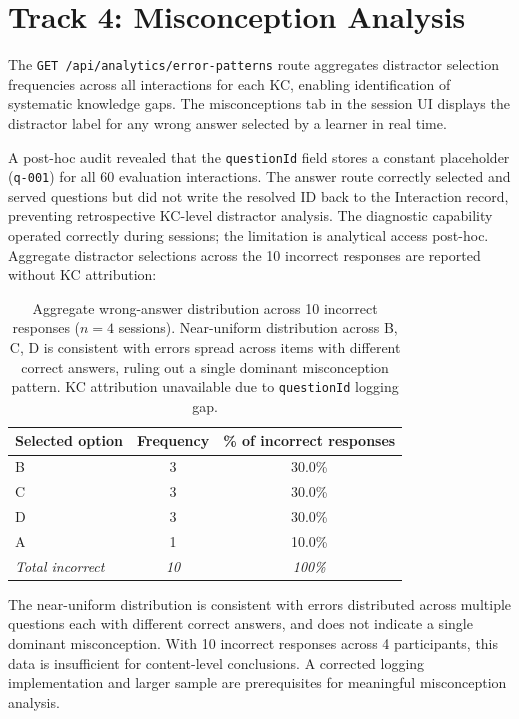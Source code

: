 \section{Track 4: Misconception Analysis}
\label{sec:results_misconceptions}

The \texttt{GET /api/analytics/error-patterns} route aggregates distractor
selection frequencies across all interactions for each KC, enabling
identification of systematic knowledge gaps. The misconceptions tab in the
session UI displays the distractor label for any wrong answer selected by a
learner in real time.

A post-hoc audit revealed that the \texttt{questionId} field stores a constant
placeholder (\texttt{q-001}) for all 60 evaluation interactions. The answer
route correctly selected and served questions but did not write the resolved ID
back to the Interaction record, preventing retrospective KC-level distractor
analysis. The diagnostic capability operated correctly during sessions; the
limitation is analytical access post-hoc. Aggregate distractor selections
across the 10 incorrect responses are reported without KC attribution:

\begin{table}[H]
\centering
\caption{Aggregate wrong-answer distribution across 10 incorrect responses
($n = 4$ sessions). Near-uniform distribution across B, C, D is consistent
with errors spread across items with different correct answers, ruling out
a single dominant misconception pattern. KC attribution unavailable due to
\texttt{questionId} logging gap.}
\label{tab:misconceptions}
\renewcommand{\arraystretch}{1.25}
\begin{tabular}{lcc}
\toprule
\textbf{Selected option} & \textbf{Frequency} & \textbf{\% of incorrect responses} \\
\midrule
B & 3 & 30.0\% \\
C & 3 & 30.0\% \\
D & 3 & 30.0\% \\
A & 1 & 10.0\% \\
\midrule
\textit{Total incorrect} & \textit{10} & \textit{100\%} \\
\bottomrule
\end{tabular}
\end{table}

The near-uniform distribution is consistent with errors distributed across
multiple questions each with different correct answers, and does not indicate
a single dominant misconception. With 10 incorrect responses across 4
participants, this data is insufficient for content-level conclusions. A
corrected logging implementation and larger sample are prerequisites for
meaningful misconception analysis.

